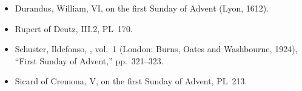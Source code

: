 {\begin{itemize}[leftmargin=1.2em,itemsep=.15em]
and , on Ps~24, nn.~1 and 4, Corpus Thomisticum text.
\item Durandus, William,  VI, on the
first Sunday of Advent (Lyon, 1612).
\item Rupert of Deutz,  III.2, PL~170.
\item Schuster, Ildefonso, ,
vol.~1 (London: Burns, Oates and Washbourne, 1924), ``First Sunday of
Advent,'' pp.~321--323.
\item Sicard of Cremona,  V, on the first Sunday of Advent,
PL~213.
\end{itemize}
\par}

